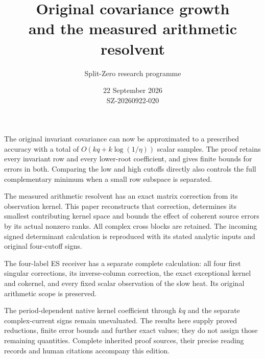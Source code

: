 \documentclass[11pt]{article}
\title{Original covariance growth\\and the measured arithmetic resolvent}
\author{Split-Zero research programme}
\date{22 September 2026\\SZ-20260922-020}
\begin{document}
\maketitle
The original invariant covariance can now be approximated to a prescribed
accuracy with a total of $O(kq+k\log(1/\eta))$ scalar samples. The proof retains
every invariant row and every lower-root coefficient, and gives finite bounds
for errors in both. Comparing the low and high cutoffs directly also controls
the full complementary minimum when a small row subspace is separated.

The measured arithmetic resolvent has an exact matrix correction from its
observation kernel. This paper reconstructs that correction, determines its
smallest contributing kernel space and bounds the effect of coherent source
errors by its actual nonzero ranks. All complex cross blocks are retained.
The incoming signed determinant calculation is reproduced with its stated
analytic inputs and original four-cutoff signs.

The four-label ES receiver has a separate complete calculation: all four
first singular corrections, its inverse-column correction, the exact
exceptional kernel and cokernel, and every fixed scalar observation of the
slow heat. Its original arithmetic scope is preserved.

The period-dependent native kernel coefficient through $kq$ and the separate
complex-current signs remain unevaluated. The results here supply proved
reductions, finite error bounds and further exact values; they do not assign
those remaining quantities. Complete inherited proof sources, their precise
reading records and human citations accompany this edition.
\begingroup\small\tableofcontents\endgroup\clearpage
\end{document}
